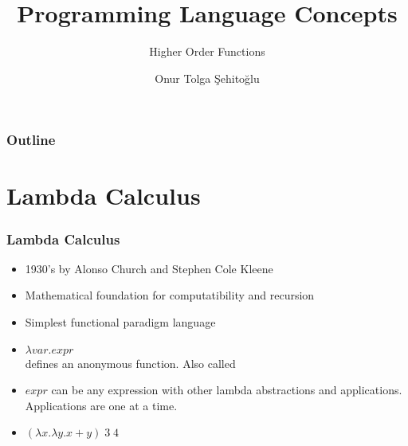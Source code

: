 \usepackage{etex}
\usepackage[utf8]{inputenc}
\usepackage{listings}
\usepackage[graph,arrow,curve]{xy}

\newcommand{\aequiv}{\mathop{\equiv_{\alpha}}}

{
  \usepackage{fullpage}
  \usepackage{pgf}
  \usepackage{hyperref}
}

{
}


\titlegraphic{\insertmetutitle\insertlicense}


\title{Programming Language Concepts}
\author{Onur Tolga Şehitoğlu}
\subtitle{Higher Order Functions}
\date{}


%
%
%
%

 \frame[plain]{\maketitle}

 \begin{frame}
 \frametitle{Outline}
\small
 \tableofcontents
 \end{frame}

\section{Lambda Calculus}
\begin{frame}
\frametitle{Lambda Calculus}
\begin{itemize}
 \item 1930's by Alonso Church and Stephen Cole Kleene
 \item Mathematical foundation for computatibility and recursion
 \item Simplest functional paradigm language
 \item $\lambda var . expr$ \\
	defines an anonymous function. Also called 
 \item $expr$ can be any expression with other lambda abstractions and 
	applications. Applications are one at a time.
 \item $(\lambda x . \lambda y . x+y) \; 3 \; 4$ 
\end{itemize}
\end{frame}

